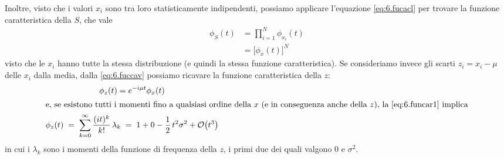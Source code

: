 Inoltre, visto che i valori $x_i$ sono tra loro
statisticamente indipendenti, possiamo applicare l'equazione
\eqref{eq:6.fucacl} per trovare la funzione caratteristica
della $S$, che vale
\begin{align*}
  \phi_S(t) &= \prod_{i=1}^N \phi_{x_i}(t) \\[1ex]
  &= \bigl[ \phi_x(t) \bigr]^N
\end{align*}
visto che le $x_i$ hanno tutte la stessa distribuzione (e
quindi la stessa funzione caratteristica).  Se consideriamo
invece gli scarti $z_i = x_i - \mu$ delle $x_i$ dalla media,
dalla \eqref{eq:6.fuccav} possiamo ricavare la funzione
caratteristica della $z$:
\begin{gather}
  \phi_z(t) = e^{- i \mu t} \phi_x(t) \label{eq:9.phiz}
    \\
  \intertext{e, se esistono tutti i momenti fino a
    qualsiasi ordine della $x$ (e in conseguenza anche
    della $z$), la \eqref{eq:6.funcar1} implica}
  \phi_z(t) \; = \; \sum_{k=0}^{\infty}
    \frac{(it)^k}{k!} \, \lambda_k \; = \; 1 + 0 -
    \frac{1}{2} \, t^2 \sigma^2 + \mathcal{O} \bigl( t^3
    \bigr) \label{eq:9.phizsv}
\end{gather}
in cui i $\lambda_k$ sono i momenti della funzione di
frequenza della $z$, i primi due dei quali valgono 0 e
$\sigma^2$.

